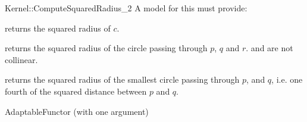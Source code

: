 \begin{ccRefFunctionObjectConcept}{Kernel::ComputeSquaredRadius_2}
A model for this must provide:


       {returns the squared radius of $c$. }

       {returns the squared radius of the circle passing through $p$, $q$
       and $r$. \ccPrecond {} and  are not collinear.}

{returns the squared radius of the smallest circle passing through $p$,
and $q$, i.e. one fourth of the squared distance between $p$ and $q$.}

\ccRefines
AdaptableFunctor (with one argument)

\ccSeeAlso
{} \\
  \\

\end{ccRefFunctionObjectConcept}
